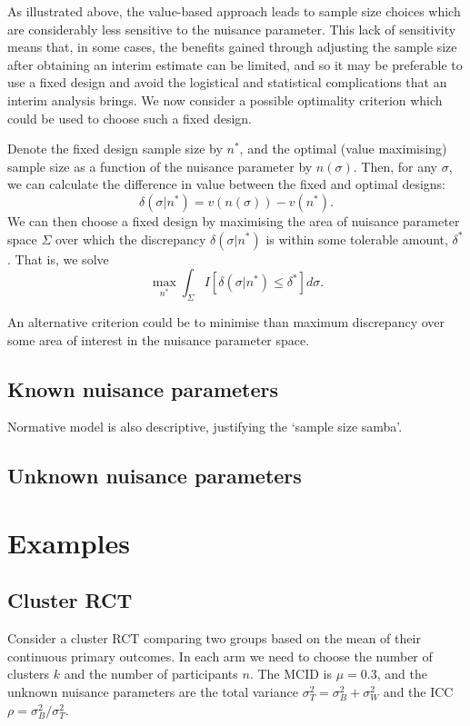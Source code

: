 \documentclass[sagev]{sagej}
\begin{document}
As illustrated above, the value-based approach leads to sample size choices which are considerably less sensitive to the nuisance parameter. This lack of sensitivity means that, in some cases, the benefits gained through adjusting the sample size after obtaining an interim estimate can be limited, and so it may be preferable to use a fixed design and avoid the logistical and statistical complications that an interim analysis brings. We now consider a possible optimality criterion which could be used to choose such a fixed design.

Denote the fixed design sample size by $n^*$, and the optimal (value maximising) sample size as a function of the nuisance parameter by $n(\sigma)$. Then, for any $\sigma$, we can calculate the difference in value between the fixed and optimal designs:
$$
\delta(\sigma | n^*) = v(n(\sigma)) - v(n^*).
$$
We can then choose a fixed design by maximising the area of nuisance parameter space $\Sigma$ over which the discrepancy $\delta(\sigma | n^*)$ is within some tolerable amount, $\delta^*$. That is, we solve
$$
\max_{n^*} \int_{\Sigma} I[\delta(\sigma | n^*) \leq \delta^*] d\sigma.
$$

An alternative criterion could be to minimise than maximum discrepancy over some area of interest in the nuisance parameter space.


\subsection{Known nuisance parameters}

Normative model is also descriptive, justifying the `sample size samba'.

\subsection{Unknown nuisance parameters}



\section{Examples}

\subsection{Cluster RCT}

Consider a cluster RCT comparing two groups based on the mean of their continuous primary outcomes. In each arm we need to choose the number of clusters $k$ and the number of participants $n$. The MCID is $\mu = 0.3$, and the unknown nuisance parameters are the total variance $\sigma_T^2 = \sigma_B^2 + \sigma_W^2$ and the ICC $\rho = \sigma_B^2/\sigma_T^2$.
\end{document}
